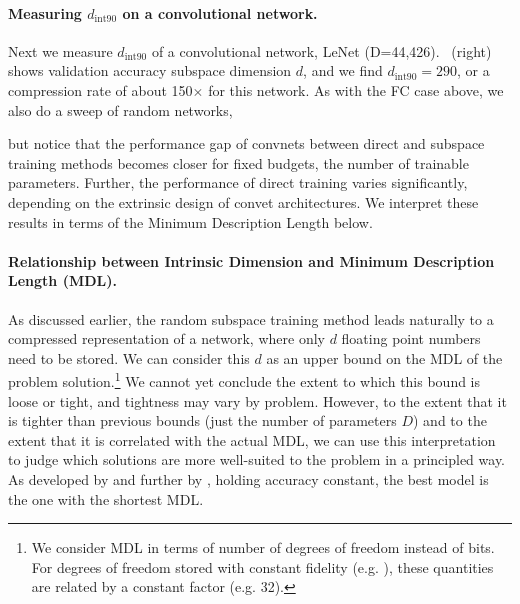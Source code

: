 \documentclass{article} %
\newcommand{\dintn}{d_{\mathrm{int90}}}
\begin{document}
\paragraph{Measuring $\dintn$ on a convolutional network.}
Next we measure $\dintn$ of a convolutional network, LeNet (D=44,426).
~(right) shows validation accuracy \vs subspace dimension $d$, and
we find $\dintn=290$, or a compression rate of about 150$\times$ for this network.
As with the FC case above, we also do a sweep of random networks,

but notice that the performance gap of convnets between direct and subspace training methods becomes closer for fixed budgets, \ie the number of trainable parameters. Further, the performance of direct training varies significantly, depending on the extrinsic design of convet architectures.
We interpret these results in terms of the Minimum Description Length below.


\paragraph{Relationship between Intrinsic Dimension and Minimum Description Length (MDL).}
As discussed earlier, the random subspace training method leads naturally to a compressed representation of a network, where only $d$ floating point numbers need to be stored.
We can consider this $d$ as an upper bound on the MDL of the problem solution.\footnote{We consider MDL in terms of number of degrees of freedom instead of bits. For degrees of freedom stored with constant fidelity (e.g. ), these quantities are related by a constant factor (e.g. 32).} We cannot yet conclude the extent to which this bound is loose or tight, and tightness may vary by problem.
However, to the extent that it is tighter than previous bounds (\eg just the number of parameters $D$) and to the extent that it is correlated with the actual MDL,
we can use this interpretation to judge which solutions are more well-suited
to the problem in a principled way.
As developed by \cite{rissanen-1978-automatica-modeling-by-shortest-data} and further by \cite{hinton-1993-COLT-keeping-the-neural-networks}, holding accuracy constant, the best model is the one with the shortest MDL.
\end{document}
